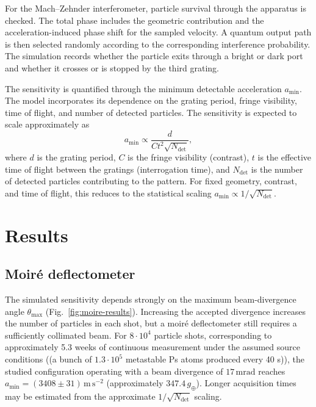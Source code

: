 \documentclass[10pt,twocolumn]{article}
\begin{document}
For the Mach--Zehnder interferometer, particle survival through the apparatus is checked. The total phase includes the geometric contribution and the acceleration-induced phase shift for the sampled velocity. A quantum output path is then selected randomly according to the corresponding interference probability. The simulation records whether the particle exits through a bright or dark port and whether it crosses or is stopped by the third grating.

The sensitivity is quantified through the minimum detectable acceleration $a_{\min}$. The model incorporates its dependence on the grating period, fringe visibility, time of flight, and number of detected particles. The sensitivity is expected to scale approximately as
\begin{equation}
  a_{\min}\propto\frac{d}{C t^2\sqrt{N_{\mathrm{det}}}},
  \label{eq:acceleration-sensitivity}
\end{equation}
where $d$ is the grating period, $C$ is the fringe visibility (contrast), $t$ is the effective time of flight between the gratings (interrogation time), and $N_{\mathrm{det}}$ is the number of detected particles contributing to the pattern. For fixed geometry, contrast, and time of flight, this reduces to the statistical scaling $a_{\min}\propto1/\sqrt{N_{\mathrm{det}}}$.

\section{Results}

\subsection{Moir\'e deflectometer}

The simulated sensitivity depends strongly on the maximum beam-divergence angle $\theta_{\max}$ (Fig.~\ref{fig:moire-results}). Increasing the accepted divergence increases the number of particles in each shot, but a moir\'e deflectometer still requires a sufficiently collimated beam. For $8\cdot10^4$ particle shots, corresponding to approximately 5.3 weeks of continuous measurement under the assumed source conditions ((a bunch of $1.3\cdot10^5$ metastable Ps atoms produced every 40 s)), the studied configuration operating with a beam divergence of $17\,\mathrm{mrad}$ reaches $a_{\min} = (3408 \pm 31)\,\mathrm{m\,s^{-2}}$ (approximately $347.4\,g_\oplus$). Longer acquisition times may be estimated from the approximate $1/\sqrt{N_{\mathrm{det}}}$ scaling.
\end{document}
